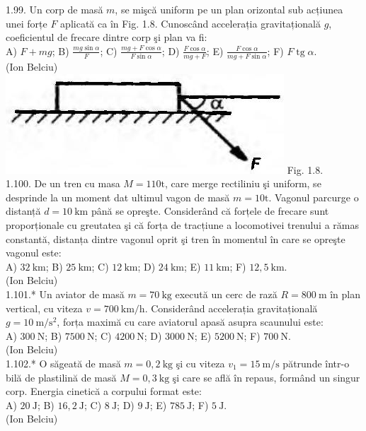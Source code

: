 1.99. Un corp de masă $m$, se mişcă uniform pe un plan orizontal sub acțiunea unei forțe $F$ aplicată ca în Fig. 1.8. Cunoscând accelerația gravitațională $g$, coeficientul de frecare dintre corp şi plan va fi:\\ A) $F+m g$; B) $\frac{m g \sin \alpha}{F}$; C) $\frac{m g+F \cos \alpha}{F \sin \alpha}$; D) $\frac{F \cos \alpha}{m g+F}$; E) $\frac{F \cos \alpha}{m g+F \sin \alpha}$; F) $F \operatorname{tg} \alpha$.\\ (Ion Belciu)\\ \includegraphics[width=0.4\linewidth]{images/2025_07_01_5b3ff9fa0d508c8e9f17g-024} Fig. 1.8.\\

1.100. De un tren cu masa $M=110 \mathrm{t}$, care merge rectiliniu şi uniform, se desprinde la un moment dat ultimul vagon de masă $m=10 \mathrm{t}$. Vagonul parcurge o distanță $d=10 \mathrm{~km}$ până se opreşte. Considerând că forțele de frecare sunt proporționale cu greutatea şi că forța de tracțiune a locomotivei trenului a rămas constantă, distanța dintre vagonul oprit şi tren în momentul în care se opreşte vagonul este:\\ A) $32 \mathrm{~km}$; B) $25 \mathrm{~km}$; C) $12 \mathrm{~km}$; D) $24 \mathrm{~km}$; E) $11 \mathrm{~km}$; F) $12,5 \mathrm{~km}$.\\ (Ion Belciu)\\

1.101.* Un aviator de masă $m=70 \mathrm{~kg}$ execută un cerc de rază $R=800 \mathrm{~m}$ în plan vertical, cu viteza $v=700 \mathrm{~km} / \mathrm{h}$. Considerând accelerația gravitațională $g=10 \mathrm{~m} / \mathrm{s}^{2}$, forța maximă cu care aviatorul apasă asupra scaunului este:\\ A) $300 \mathrm{~N}$; B) $7500 \mathrm{~N}$; C) $4200 \mathrm{~N}$; D) $3000 \mathrm{~N}$; E) $5200 \mathrm{~N}$; F) $700 \mathrm{~N}$.\\ (Ion Belciu)\\

1.102.* O săgeată de masă $m=0,2 \mathrm{~kg}$ şi cu viteza $v_{1}=15 \mathrm{~m} / \mathrm{s}$ pătrunde într-o bilă de plastilină de masă $M=0,3 \mathrm{~kg}$ şi care se află în repaus, formând un singur corp. Energia cinetică a corpului format este:\\ A) $20 \mathrm{~J}$; B) $16,2 \mathrm{~J}$; C) $8 \mathrm{~J}$; D) $9 \mathrm{~J}$; E) $785 \mathrm{~J}$; F) $5 \mathrm{~J}$.\\ (Ion Belciu)\\

